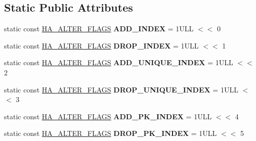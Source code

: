 \subsection*{Static Public Attributes}
\begin{DoxyCompactItemize}
\item 
\mbox{\label{classAlter__inplace__info_a87f839b722911bc61459067ebd540241}} 
static const \mbox{\hyperlink{classAlter__inplace__info_a45258f36b4942b5cabee7239463daaca}{H\+A\+\_\+\+A\+L\+T\+E\+R\+\_\+\+F\+L\+A\+GS}} {\bfseries A\+D\+D\+\_\+\+I\+N\+D\+EX} = 1\+U\+L\+L $<$$<$ 0
\item 
\mbox{\label{classAlter__inplace__info_aa159fbfdb3dc6d44026c39c51af77df9}} 
static const \mbox{\hyperlink{classAlter__inplace__info_a45258f36b4942b5cabee7239463daaca}{H\+A\+\_\+\+A\+L\+T\+E\+R\+\_\+\+F\+L\+A\+GS}} {\bfseries D\+R\+O\+P\+\_\+\+I\+N\+D\+EX} = 1\+U\+L\+L $<$$<$ 1
\item 
\mbox{\label{classAlter__inplace__info_a983d3b02fc04380df2e66437ac1046d4}} 
static const \mbox{\hyperlink{classAlter__inplace__info_a45258f36b4942b5cabee7239463daaca}{H\+A\+\_\+\+A\+L\+T\+E\+R\+\_\+\+F\+L\+A\+GS}} {\bfseries A\+D\+D\+\_\+\+U\+N\+I\+Q\+U\+E\+\_\+\+I\+N\+D\+EX} = 1\+U\+L\+L $<$$<$ 2
\item 
\mbox{\label{classAlter__inplace__info_aa2ccdd254d2074e807577f113e2509a1}} 
static const \mbox{\hyperlink{classAlter__inplace__info_a45258f36b4942b5cabee7239463daaca}{H\+A\+\_\+\+A\+L\+T\+E\+R\+\_\+\+F\+L\+A\+GS}} {\bfseries D\+R\+O\+P\+\_\+\+U\+N\+I\+Q\+U\+E\+\_\+\+I\+N\+D\+EX} = 1\+U\+L\+L $<$$<$ 3
\item 
\mbox{\label{classAlter__inplace__info_a3e230586b506ac7a97bd164ed347fc87}} 
static const \mbox{\hyperlink{classAlter__inplace__info_a45258f36b4942b5cabee7239463daaca}{H\+A\+\_\+\+A\+L\+T\+E\+R\+\_\+\+F\+L\+A\+GS}} {\bfseries A\+D\+D\+\_\+\+P\+K\+\_\+\+I\+N\+D\+EX} = 1\+U\+L\+L $<$$<$ 4
\item 
\mbox{\label{classAlter__inplace__info_ac8fcd6469638be24fe60f83c8bf6f0b2}} 
static const \mbox{\hyperlink{classAlter__inplace__info_a45258f36b4942b5cabee7239463daaca}{H\+A\+\_\+\+A\+L\+T\+E\+R\+\_\+\+F\+L\+A\+GS}} {\bfseries D\+R\+O\+P\+\_\+\+P\+K\+\_\+\+I\+N\+D\+EX} = 1\+U\+L\+L $<$$<$ 5

\end{DoxyCompactItemize}
